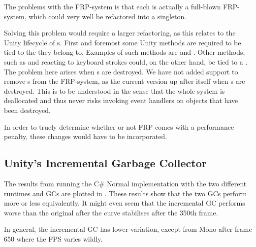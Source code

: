 
The problems with the \gls{FRP}-system is that each  is actually a full-blown \gls{FRP}-system, which could very well be refactored into a singleton.

Solving this problem would require a larger refactoring, as this relates to the Unity lifecycle of s. First and foremost some Unity methods are required to be tied to the  they belong to. Examples of such methods are  and . Other methods, such as  and reacting to keyboard strokes could, on the other hand, be tied to a . The problem here arises when s are destroyed. We have not added support to remove s from the \gls{FRP}-system, as the current version  up after itself when s are destroyed. This is to be understood in the sense that the whole system is deallocated and thus never risks invoking event handlers on objects that have been destroyed.

In order to truely determine whether or not \gls{FRP} comes with a performance penalty, these changes would have to be incorporated.

\subsection{Unity's Incremental Garbage Collector}
The results from running the C\# Normal implementation with the two different runtimes and \glspl{GC} are plotted in . These results show that the two \glspl{GC} perform more or less equivalently. It might even seem that the incremental \gls{GC} performs worse than the original after the curve stabilises after the 350th frame.

In general, the incremental \gls{GC} has lower variation, except from Mono after frame 650 where the \gls{FPS} varies wildly.


